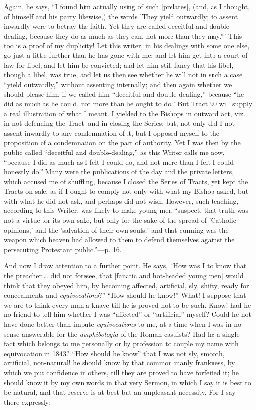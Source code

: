 Again, he says, ``I found him actually using of such [prelates], (and, as I thought, of himself and his party likewise,) the
words 'They yield outwardly; to assent inwardly were to betray the
faith. Yet they are called deceitful and double-dealing, because they do
as much as they can, not more than they may.''' This too is a
proof of my duplicity! Let this writer, in his dealings
with some one else, go just a little further than he has gone
with me; and let him get into a court of law for libel; and let him be
convicted; and let him still fancy that his libel, though a libel, was
true, and let us then see whether he will not in such a case ``yield
outwardly,'' without assenting internally; and then again whether we
should please him, if we called him ``deceitful and
double-dealing,'' because ``he did as much as he could, not more
than he ought to do.'' But Tract 90 will supply a real illustration
of what I meant. I yielded to the Bishops in outward act, viz. in not
defending the Tract, and in closing the Series; but, not only did I not
assent inwardly to any condemnation of it, but I opposed myself to the
proposition of a condemnation on the part of authority. Yet I was then
by the public called ``deceitful and double-dealing,'' as this
Writer calls me now, ``because I did as much as I felt I could do,
and not more than I felt I could honestly do.'' Many were the
publications of the day and the private letters, which accused me of
shuffling, because I closed the Series of Tracts, yet kept the Tracts on
sale, as if I ought to comply not only with what my Bishop asked, but
with what he did not ask, and perhaps did not wish. However, such
teaching, according to this Writer, was likely to make young men ``suspect, that truth was not a virtue for its own sake, but
only for the sake of the spread of 'Catholic opinions,' and the 'salvation of their own souls;' and that
cunning was the weapon which heaven had allowed
to them to defend themselves against the persecuting Protestant
public.''—p. 16.

And now I draw attention to a further point. He says, ``How was I to know that the
preacher … did not foresee, that [fanatic and hot-headed young men] would think that they obeyed him, by becoming affected,
artificial, sly, shifty, ready for concealments and \emph{equivocations}?''
``How should he know!'' What! I suppose that we are to
think every man a knave till he is proved not to be such. Know! had he
no friend to tell him whether I was ``affected'' or
``artificial'' myself? Could he not have done better than
impute \emph{equivocations} to me, at a time when I was in no sense
answerable for the \emph{amphibologia} of the Roman casuists? Had he a single fact which belongs to me personally or by profession
to couple my name with equivocation in 1843? ``How should he
know'' that I was not sly, smooth, artificial, non-natural! he
should know by that common manly frankness, by which we
put confidence in others, till they are proved to have forfeited it; he
should know it by my own words in that very Sermon, in which I say it is
best to be natural, and that reserve is at best but an unpleasant
necessity. For I say there expressly:—

